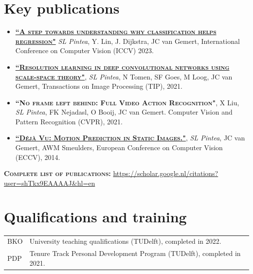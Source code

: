 \documentclass[a4paper, oneside, final]{scrartcl}
\begin{document}
\begin{center}
		\section{Key publications}
        \begin{flushleft}
            \begin{itemize}
                \item \textsc{\textbf{\href{https://github.com/SilviaLauraPintea/reg-cls}{``A step towards understanding why classification helps regression"}}} \emph{SL Pintea}, Y. Lin, J. Dijkstra, JC van Gemert, International Conference on Computer Vision (ICCV) 2023.\\[3px]

                \item \textsc{\textbf{\href{https://github.com/SilviaLauraPintea/N-JetNet}{``Resolution learning in deep convolutional networks using scale-space theory"}}}, \emph{SL Pintea}, N Tomen, SF Goes, M Loog, JC van Gemert, Transactions on Image Processing (TIP), 2021.\\[3px]
                \item \textsc{\textbf{``No frame left behind: Full Video Action Recognition"}}, X Liu, \emph{SL Pintea}, FK Nejadasl, O Booij, JC van Gemert. Computer Vision and Pattern Recognition (CVPR), 2021.\\[3px]
        \item \textsc{\textbf{\href{http://github.com/SilviaLauraPintea/DejaVu}{``D\'{e}j\`{a} Vu: Motion Prediction in Static Images."}}}, \emph{SL Pintea}, JC van Gemert, AWM Smeulders, European Conference on Computer Vision (ECCV), 2014.\\[10px]
            \end{itemize}
        \textsc{\textbf{Complete list of publications:}} \href{https://scholar.google.nl/citations?user=shTkx9EAAAAJ&hl=en}{https://scholar.google.nl/citations?user=shTkx9EAAAAJ\&hl=en}\\
        \end{flushleft}
		\section{Qualifications and training}
        \begin{tabular}{p{3.5cm}@{\hskip 0.3in}p{12.3cm}}
            \textsc{BKO}                   & University teaching qualifications (TUDelft), completed in 2022.\\
            \textsc{PDP}                   & Tenure Track Personal Development Program (TUDelft), completed in 2021.\\
		\end{tabular}

\end{center}
\end{document}

